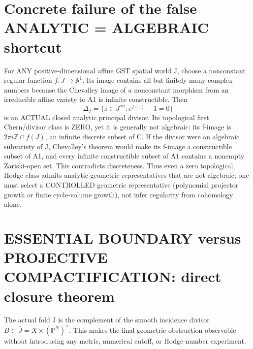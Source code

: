 \documentclass[11pt]{article}
\begin{document}
\section{Concrete failure of the false ANALYTIC = ALGEBRAIC shortcut}
For ANY positive-dimensional affine
GST spatial world J, choose a
nonconstant regular function
$f:J\to\mathbb A^1$. Its image
contains all but finitely many
complex numbers because the
Chevalley image of a nonconstant
morphism from an irreducible
affine variety to A1 is infinite
constructible. Then
\[
 \boxed{\Delta_f=\{z\in J^{an}:
                     e^{f(z)}-1=0\}}              \tag{9.4}
\]
is an ACTUAL closed analytic
principal divisor. Its topological
first Chern/divisor class is ZERO,
yet it is generally not algebraic:
its f-image is
$2\pi i\mathbb Z\cap f(J)$,
an infinite discrete subset of C.
If the divisor were an algebraic
subvariety of J, Chevalley's theorem
would make its f-image a constructible
subset of A1, and every infinite
constructible subset of A1 contains
a nonempty Zariski-open set.
This contradicts discreteness.
Thus even a zero topological Hodge
class admits analytic geometric
representatives that are not
algebraic; one must select
a CONTROLLED geometric
representative (polynomial
projector growth or finite
cycle-volume growth), not infer
regularity from cohomology alone.

\section{ESSENTIAL BOUNDARY versus PROJECTIVE COMPACTIFICATION: direct closure theorem}
The actual fold J is the complement
of the smooth incidence divisor
$B\subset\bar J=X\times(\mathbb P^N)^\vee$.
This makes the final geometric
obstruction observable without
introducing any metric, numerical
cutoff, or Hodge-number experiment.
\end{document}
